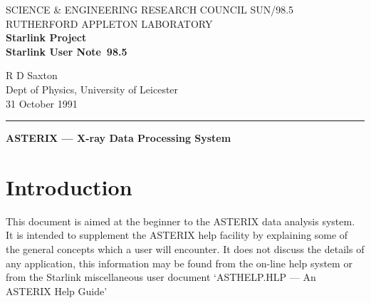 \pagestyle{myheadings}

\newcommand{\stardoccategory}  {Starlink User Note}
\newcommand{\stardocinitials}  {SUN}
\newcommand{\stardocnumber}    {98.5}
\newcommand{\stardocauthors}   {R D Saxton}
\newcommand{\stardocdate}      {31 October 1991}
\newcommand{\stardoctitle}     {ASTERIX --- X-ray Data Processing System}

\newcommand{\stardocname}{\stardocinitials /\stardocnumber}
\renewcommand{\_}{{\tt\char'137}}     %
\markright{\stardocname}
\setlength{\textwidth}{160mm}
\setlength{\textheight}{230mm}
\setlength{\topmargin}{-2mm}
\setlength{\oddsidemargin}{0mm}
\setlength{\evensidemargin}{0mm}
\setlength{\parindent}{0mm}
\setlength{\parskip}{\medskipamount}
\setlength{\unitlength}{1mm}


\thispagestyle{empty}
SCIENCE \& ENGINEERING RESEARCH COUNCIL \hfill \stardocname\\
RUTHERFORD APPLETON LABORATORY\\
{\large\bf Starlink Project\\}
{\large\bf \stardoccategory\ \stardocnumber}
\begin{flushright}
\stardocauthors\\
Dept of Physics, University of Leicester\\
\stardocdate
\end{flushright}
\vspace{-4mm}
\rule{\textwidth}{0.5mm}
\vspace{5mm}
\begin{center}
{\Large\bf \stardoctitle}
\end{center}
\vspace{5mm}

\setlength{\parskip}{0mm}
\tableofcontents
\setlength{\parskip}{\medskipamount}
\markright{\stardocname}

\newpage

\section{Introduction }

This document is aimed at the beginner to the ASTERIX data analysis system. It
is intended to supplement the ASTERIX help facility by explaining some of the
general concepts which a user will encounter. It does not discuss the details
of any application, this information may be found from the on-line  help system
or from the Starlink miscellaneous user document `ASTHELP.HLP --- An ASTERIX
Help Guide'

